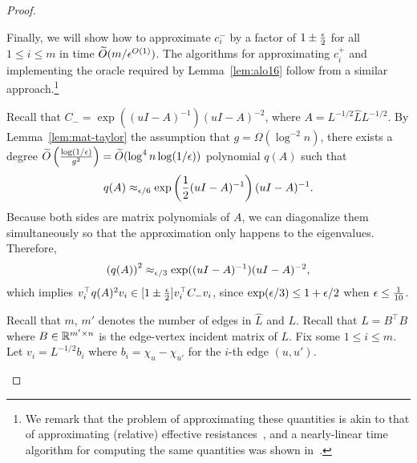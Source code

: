 \begin{proof}
\begin{enumerate}
Finally, 
we will show how to approximate $c^-_i$ by a factor of $1 \pm \frac{\epsilon}{2}$ for all $1 \le i \le m$ in time $\widetilde O(m / \epsilon^{O(1)})$.
The algorithms for approximating $c^+_i$ and implementing the oracle required by Lemma~\ref{lem:alo16} follow from a similar approach.\footnote{
We remark that the problem of approximating these quantities is akin to that of approximating (relative) effective resistances~\citep{SpielmanS11, AllenLO15, LeeS15}, and a nearly-linear time algorithm for computing the same quantities was shown in~\citep{LeeS17}.}

Recall that $C_- = \exp((uI - A)^{-1}) (uI-A)^{-2}$, where $A = L^{-1/2} \hat L L^{-1/2}$.
By Lemma~\ref{lem:mat-taylor} the assumption that $g = \Omega(\log^{-2} n)$, there exists a degree $\widetilde O\left(\frac{\log(1/\epsilon)}{g^2}\right) = \widetilde O(\log^4 n \log(1/\epsilon))$ polynomial $q(A)$ such that
\[
q(A) \approx_{\epsilon/6} \exp\left(\frac{1}{2}(uI - A)^{-1}\right) (uI-A)^{-1}.
\]
Because both sides are matrix polynomials of $A$, we can diagonalize them simultaneously so that the approximation only happens to the eigenvalues. Therefore,
\[
\left(q(A)\right)^2 \approx_{\epsilon/3} \exp((uI - A)^{-1}) (uI-A)^{-2},
\]
which implies $v_i^\top q(A)^2 v_i \in [1\pm \frac{\epsilon}{2}] v_i^\top C_- v_i$, since $\exp(\epsilon/3) \le 1+\epsilon/2$ when $\epsilon \le \frac{1}{10}$.

Recall that $m$, $m'$ denotes the number of edges in $\hat L$ and $L$.
Recall that $L = B^\top B$ where $B \in \mathbb{R}^{m' \times n}$ is the edge-vertex incident matrix of $L$.
Fix some $1 \le i \le m$.
Let $v_i = L^{-1/2} b_i$ where $b_i = \chi_u - \chi_{u'}$ for the $i$-th edge $(u, u')$.


\end{enumerate}
\end{proof}
